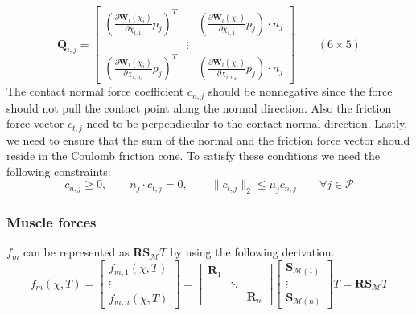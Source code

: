 \documentclass[a4paper,10pt]{article}
\begin{document}
\begin{equation}
\mathbf{Q}_{i,j} =
\left [
\begin{array}{ccc}
\left( \frac{\partial\mathbf{W}_i(\chi_{i})}{\partial\chi_{i,1}}p_j \right)^T &  &  \left( \frac{\partial\mathbf{W}_i(\chi_{i})}{\partial\chi_{i,1}}p_j \right) \cdot n_j \\
& \vdots & \\
\left( \frac{\partial\mathbf{W}_i(\chi_{i})}{\partial\chi_{i,n_d}}p_j \right)^T &  &  \left( \frac{\partial\mathbf{W}_i(\chi_{i})}{\partial\chi_{i,n_d}}p_j \right) \cdot n_j
\end{array}
\right ] \quad\quad (6 \times 5)
\end{equation}
The contact normal force coefficient $c_{n,j}$ should be nonnegative since the force
should not pull the contact point along the normal direction.
Also the friction force vector $c_{t,j}$ need to be perpendicular to
the contact normal direction. Lastly, we need to ensure that the sum of
the normal and the friction force vector should reside in the Coulomb friction cone.
To satisfy these conditions we need the following constraints:
\begin{equation}\label{Contact_force_constraints}
c_{n,j}           \geq  0,               \quad\quad
n_j \cdot c_{t,j}   =   0,               \quad\quad
\| c_{t,j} \|_2   \leq  \mu _j c_{n,j}   \quad\quad  \forall j \in \mathcal{P}
\end{equation}



\subsubsection{Muscle forces}
$f_m$ can be represented as $\mathbf{R}\mathbf{S}_\mathcal{M} T$ by using the following derivation.
\begin{equation}\label{f_m_lin}
f_m(\chi, T) = \left [
\begin{array}{c}
f_{m,1}(\chi, T )\\
\vdots\\
f_{m,n}(\chi, T )
\end{array}
\right ]
=
\left [
\begin{array}{ccc}
\mathbf{R}_1                      &            &                               \\
                                  &  \ddots    &                               \\
                                  &            & \mathbf{R}_n
\end{array}
\right ]
\left [
\begin{array}{c}
\mathbf{S}_{\mathcal{M}(1)}  \\
\vdots  \\
\mathbf{S}_{\mathcal{M}(n)}
\end{array}
\right ]
T
=
\mathbf{R} \mathbf{S}_\mathcal{M} T
\end{equation}
\end{document}
